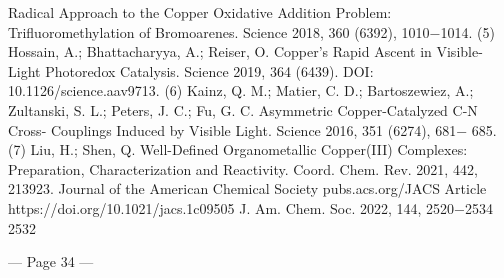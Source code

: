 \documentclass{article}
\begin{document}
Radical Approach to the Copper Oxidative Addition Problem:
Trifluoromethylation of Bromoarenes. Science 2018, 360 (6392),
1010−1014.
(5) Hossain, A.; Bhattacharyya, A.; Reiser, O. Copper’s Rapid Ascent
in Visible-Light Photoredox Catalysis. Science 2019, 364 (6439).
DOI: 10.1126/science.aav9713.
(6) Kainz, Q. M.; Matier, C. D.; Bartoszewiez, A.; Zultanski, S. L.;
Peters, J. C.; Fu, G. C. Asymmetric Copper-Catalyzed C-N Cross-
Couplings Induced by Visible Light. Science 2016, 351 (6274), 681−
685.
(7) Liu, H.; Shen, Q. Well-Defined Organometallic Copper(III)
Complexes: Preparation, Characterization and Reactivity. Coord.
Chem. Rev. 2021, 442, 213923.
Journal of the American Chemical Society
pubs.acs.org/JACS
Article
https://doi.org/10.1021/jacs.1c09505
J. Am. Chem. Soc. 2022, 144, 2520−2534
2532

\newpage






--- Page 34 ---
 
\end{document}
